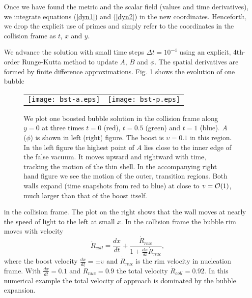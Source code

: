 \documentclass[preprintnumbers,eqsecnum,aps,prd,epsf,showpacs,nofootinbib
]{revtex4}
\newcommand{\up}{\upsilon }
\begin{document}
Once we have found the metric and the scalar field (values and time
derivatives), we integrate equations (\ref{dyn1}) and (\ref{dyn2}) in
the new coordinates. Henceforth, we drop the explicit use of primes
and simply refer to the coordinates in the collision frame as $t$, $x$
and $y$.

We advance the solution with small time steps $\Delta t=10^{-4}$ using an
explicit, 4th-order Runge-Kutta method to update $A$, $B$ and
$\phi$. The spatial derivatives are formed by finite difference
approximations.  Fig. \ref{fig-bst} shows the evolution of one bubble
\begin{figure}[htbp]
\begin{center}
\begin{tabular}{ll}
\texttt{[image: bst-a.eps]} &
\hspace{1cm}
\texttt{[image: bst-p.eps]}
\end{tabular}
\end{center}
\caption{We plot one boosted bubble solution in the collision frame
  along $y=0$ at three times $t=0$ (red), $t=0.5$ (green) and $t=1$ (blue).
  $A$ ($\phi$) is shown in left (right) figure. The
  boost is $\up=0.1$ in this region. In the left figure the highest
  point of $A$ lies close to the inner edge of the false
  vacuum. It moves upward and rightward with time,
  tracking the motion of the thin shell.  In the accompanying
  right hand figure we see the motion of the outer, transition
  regions. Both walls expand (time snapshots from red to blue) at
  close to $v={\cal O}(1)$, much larger than that of the boost
  itself.}
\label{fig-bst}
\end{figure}
in the collision frame. The plot on the right
  shows that the wall moves at nearly the speed of light to the
  left at small $x$. In the collision frame the bubble rim moves
with velocity
\begin{equation}
{\dot R}_{coll}={\frac{dx}{dt} +\frac{{\dot R}_{nuc}}{1+\frac{dx}{dt}{\dot R}_{nuc}}},
\end{equation}
where the boost velocity
$\frac{dx}{dt}=\pm\upsilon$ and ${\dot R}_{nuc}$ is the rim velocity in
nucleation frame. With $\frac{dx}{dt}=0.1$ and ${\dot R}_{nuc}=0.9$ the total
velocity ${\dot R}_{coll}=0.92$. In this numerical example the total velocity
of approach is dominated by the bubble expansion.

\newpage
\end{document}
